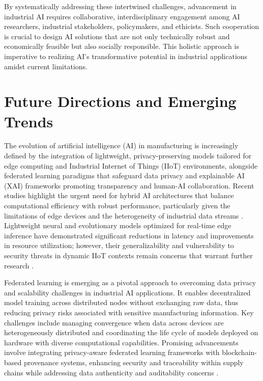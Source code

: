 \documentclass[sigconf]{acmart}
\begin{document}
\vspace{1em}
By systematically addressing these intertwined challenges, advancement in industrial AI requires collaborative, interdisciplinary engagement among AI researchers, industrial stakeholders, policymakers, and ethicists. Such cooperation is crucial to design AI solutions that are not only technically robust and economically feasible but also socially responsible. This holistic approach is imperative to realizing AI's transformative potential in industrial applications amidst current limitations.

\section{Future Directions and Emerging Trends}

The evolution of artificial intelligence (AI) in manufacturing is increasingly defined by the integration of lightweight, privacy-preserving models tailored for edge computing and Industrial Internet of Things (IIoT) environments, alongside federated learning paradigms that safeguard data privacy and explainable AI (XAI) frameworks promoting transparency and human-AI collaboration. Recent studies highlight the urgent need for hybrid AI architectures that balance computational efficiency with robust performance, particularly given the limitations of edge devices and the heterogeneity of industrial data streams \cite{ref5,ref30}. Lightweight neural and evolutionary models optimized for real-time edge inference have demonstrated significant reductions in latency and improvements in resource utilization; however, their generalizability and vulnerability to security threats in dynamic IIoT contexts remain concerns that warrant further research \cite{ref31}.

Federated learning is emerging as a pivotal approach to overcoming data privacy and scalability challenges in industrial AI applications. It enables decentralized model training across distributed nodes without exchanging raw data, thus reducing privacy risks associated with sensitive manufacturing information. Key challenges include managing convergence when data across devices are heterogeneously distributed and coordinating the life cycle of models deployed on hardware with diverse computational capabilities. Promising advancements involve integrating privacy-aware federated learning frameworks with blockchain-based provenance systems, enhancing security and traceability within supply chains while addressing data authenticity and auditability concerns \cite{ref6,ref25,ref41}.
\end{document}
